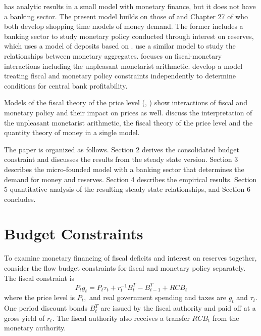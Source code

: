 \documentclass[]{article}
\begin{document}
\textcite{waters2024potentiallypleasant} has analytic results in a small model with monetary finance, but it does not have a banking sector. The present model builds on those of \textcite{ireland2014macroeconomics} and Chapter 27 of \textcite{sargent2018recursive} who both develop shopping time models of money demand. The former includes a banking sector to study monetary policy conducted through interest on reserves, which uses a model of deposits based on \textcite{christiano1995inside}. \textcite{Belongia2014monies} use a similar model to study the relationships between monetary aggregates. \textcite{sargent2018recursive} focuses on fiscal-monetary interactions including the unpleasant monetarist arithmetic. \textcite{bassetto2013fiscal} develop a model treating fiscal and monetary policy constraints independently to determine conditions for central bank profitability. 

Models of the fiscal theory of the price level (\cite{leith2016understanding}, \textcite{cochrane2022ftpl}) show interactions of fiscal and monetary policy and their impact on prices as well. \textcite{bassettosargent2020shotgun} discuss the interpretation of the unpleasant monetarist arithmetic, the fiscal theory of the price level and the quantity theory of money in a single model. 

The paper is organized as follows. Section 2 derives the consolidated budget constraint and discusses the results from the steady state version. Section 3 describes the micro-founded model with a banking sector that determines the demand for money and reserves. Section 4 describes the empirical results. Section 5 quantitative analysis of the resulting steady state relationships, and Section 6 concludes.

\section{Budget Constraints}

To examine monetary financing of fiscal deficits and interest on reserves together,
consider the flow budget constraints for fiscal and monetary policy
separately. The fiscal constraint is%
\begin{equation}
 P_{t}g_{t}=P_{t}\tau _{t}+r_{t}^{-1}B_{t}^{T}-B_{t-1}^{T}+RCB_{t}
 \label{fiscal BC}
\end{equation}
where the price level is $P_{t},$ and real government spending and taxes are $%
g_{t}$ and $\tau _{t}$. One period discount bonds $B_{t}^{T}$ are issued by the fiscal authority and paid off at a gross
yield of $r_{t}$. The fiscal authority also receives a transfer $RCB_{t}$
from the monetary authority.
\end{document}
